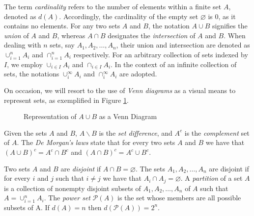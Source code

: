 The term \emph{cardinality} refers to the number of elements within a finite set $A$, denoted as $d(A)$. Accordingly, the cardinality of the empty set $\varnothing$ is 0, as it contains no elements. For any two sets $A$ and $B$, the notation $A \cup B$ signifies the \emph{union} of $A$ and $B$, whereas $A \cap B$ designates the \emph{intersection} of $A$ and $B$. When dealing with $n$ sets, say $A_1, A_2, \ldots, A_n$, their union and intersection are denoted as $\cup_{i=1}^n A_i$ and $\cap_{i=1}^n A_i$ respectively. For an arbitrary collection of sets indexed by $I$, we employ $\cup_{i \in I} A_i$ and $\cap_{i \in I} A_i$. In the context of an infinite collection of sets, the notations $\cup_{i}^{\infty} A_i$ and $\cap_{i}^{\infty} A_i$ are adopted.

On occasion, we will resort to the use of \emph{Venn diagrams} as a visual means to represent sets, as exemplified in Figure \ref{fig:Venn-diagram}.

\begin{figure}[t]
\centering
{}
\caption{\label{fig:Venn-diagram}Representation of $A \cup B$ as a Venn Diagram}
\end{figure}


Given the sets $A$ and $B$, $A \backslash B$ is the \emph{set difference}, and ${A}^c$ is the \emph{complement} set of $A$. The \emph{De Morgan's laws} state that for every two sets $A$ and $B$ we have that $\left( A \cup B \right)^c = A^c \cap B^c$ and $\left( A \cap B \right)^c = A^c \cup B^c$.

Two sets $A$ and $B$ are \emph{disjoint} if $A \cap B = \varnothing$. The sets $A_1, A_2, \ldots, A_n$ are disjoint if for every $i$ and $j$ such that $i \neq j$ we have that $A_i \cap A_j = \varnothing$. A \emph{partition} of a set $A$ is a collection of nonempty disjoint subsets of $A_1, A_2, \dots, A_n$ of $A$ such that  $A = \cup_{i=1}^n A_i$. The \emph{power set} $\mathcal{P}(A)$ is the set whose members are all possible subsets of A. If $d(A)=n$ then $d\left( \mathcal{P}(A) \right) = 2^n$.

